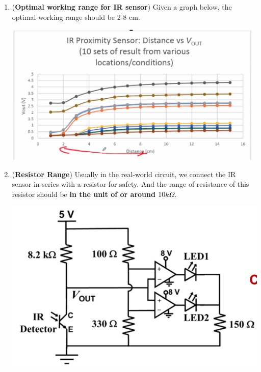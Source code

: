 \documentclass[10pt, landscape]{article}
\begin{document}
\begin{multicols}{4}
\begin{enumerate}
\begin{itemize}
    \end{itemize}
    \item (\textbf{Optimal working range for IR sensor}) Given a graph below, the optimal working range should be 2-8 cm. \\
    \centerline{\includegraphics[width=0.9\linewidth]{images/ir-sensor-working-range.png}}
    \item (\textbf{Resistor Range}) Usually in the real-world circuit, we connect the IR sensor in series with a resistor for safety. And the range of resistance of this resistor should be \textbf{in the unit of or around $10k\Omega$}. \\
    \centerline{\includegraphics[width=0.9\linewidth]{images/ir-sensor-circuit.png}}
\end{enumerate}


\end{multicols}
\end{document}
